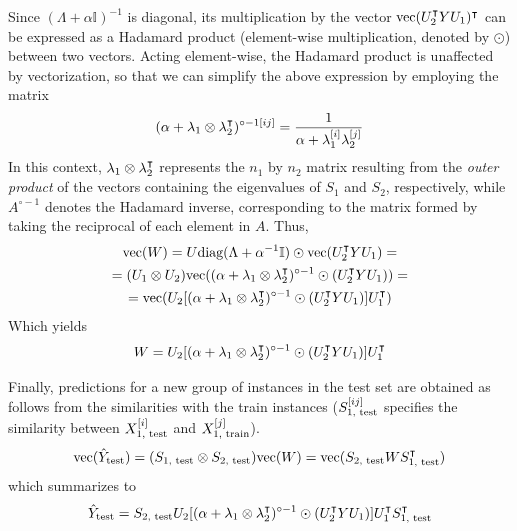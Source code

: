 %
Since $(\Lambda + \alpha\mathbb{I})^{-1}$ is diagonal, its multiplication by the vector $\text{vec}(U_2^\intercal Y U_1)^\intercal$ can be expressed as a Hadamard product (element-wise multiplication, denoted by $\odot$) between two vectors. Acting element-wise, the Hadamard product is unaffected by vectorization, so that we can simplify the above expression by employing the matrix
%
\begin{equation}
    (\alpha + \mathbf{\lambda}_1 \otimes \mathbf{\lambda}_2^\intercal)^{\circ -1[ij]}
    = \frac{1}{\alpha + \mathbf{\lambda}_1^{[i]} \mathbf{\lambda}_2^{[j]}}
\end{equation}
%
In this context, $\mathbf{\lambda}_1 \otimes \mathbf{\lambda}_2^\intercal$ represents the $n_1$ by $n_2$ matrix resulting from the \emph{outer product} of the vectors containing the eigenvalues of $S_1$ and $S_2$, respectively, while $A^{\circ -1}$ denotes the Hadamard inverse, corresponding to the matrix formed by taking the reciprocal of each element in $A$. Thus,
%
\begin{multline*}
    \text{vec}(W)
    = U \text{diag}(\Lambda + \alpha^{-1}\mathbb{I}) \odot \text{vec}(U_2^\intercal Y U_1)
    =\\
    = (U_1 \otimes U_2) \text{vec}(
        (\alpha + \mathbf{\lambda}_1 \otimes \mathbf{\lambda}_2^\intercal)^{\circ -1}
        \odot (U_2^\intercal Y U_1)
    )
    =\\
    = \text{vec}(
        U_2
        [
            (\alpha + \mathbf{\lambda}_1 \otimes \mathbf{\lambda}_2^\intercal)^{\circ -1}
            \odot (U_2^\intercal Y U_1)
        ]
        U_1^\intercal
    )
\end{multline*}
%
Which yields
%
\begin{equation}
    W = 
        U_2
        [
            (\alpha + \mathbf{\lambda}_1 \otimes \mathbf{\lambda}_2^\intercal)^{\circ -1}
            \odot (U_2^\intercal Y U_1)
        ]
        U_1^\intercal
\end{equation}

Finally, predictions for a new group of instances in the test set are obtained as follows from the similarities with the train instances ($S_\text{1, test}^{[ij]}$ specifies the similarity between $X_\text{1, test}^{[i]}$ and $X_\text{1, train}^{[j]}$).
%
\begin{equation}
    \text{vec}(\hat Y_\text{test})
    = (S_\text{1, test} \otimes S_\text{2, test}) \text{vec}(W)
    = \text{vec}(S_\text{2, test} W S_\text{1, test}^\intercal)
\end{equation}
%
which summarizes to
%
\begin{equation}
    \hat Y_\text{test} =
        S_\text{2, test}
        U_2
        [
            (\alpha + \mathbf{\lambda}_1 \otimes \mathbf{\lambda}_2^\intercal)^{\circ -1}
            \odot (U_2^\intercal Y U_1)
        ]
        U_1^\intercal
        S_\text{1, test}^\intercal
\end{equation}

